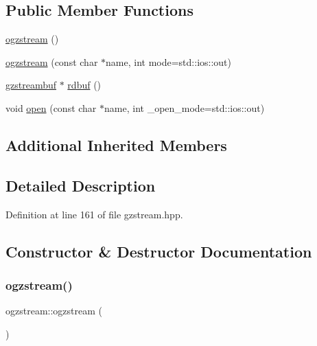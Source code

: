 \subsection*{Public Member Functions}
\begin{DoxyCompactItemize}
\item 
\hyperlink{classogzstream_a1c765db8ca4173d8c34f5450bfb27750}{ogzstream} ()
\item 
\hyperlink{classogzstream_af1c122fb77cbd03758c820f7499ebdd8}{ogzstream} (const char $\ast$name, int mode=std\+::ios\+::out)
\item 
\hyperlink{classgzstreambuf}{gzstreambuf} $\ast$ \hyperlink{classogzstream_a1034f1ed3d34e9db919d240a93d3888d}{rdbuf} ()
\item 
void \hyperlink{classogzstream_aff704df274dda46c84ef1e814e84b05e}{open} (const char $\ast$name, int \+\_\+open\+\_\+mode=std\+::ios\+::out)
\end{DoxyCompactItemize}
\subsection*{Additional Inherited Members}


\subsection{Detailed Description}


Definition at line 161 of file gzstream.\+hpp.



\subsection{Constructor \& Destructor Documentation}
\mbox{\label{classogzstream_a1c765db8ca4173d8c34f5450bfb27750}} 
\subsubsection{\texorpdfstring{ogzstream()}{ogzstream()}\hspace{0.1cm}{\footnotesize\ttfamily [1/2]}}
{\footnotesize\ttfamily ogzstream\+::ogzstream (\begin{DoxyParamCaption}{ }\end{DoxyParamCaption})\hspace{0.3cm}{\ttfamily [inline]}}



